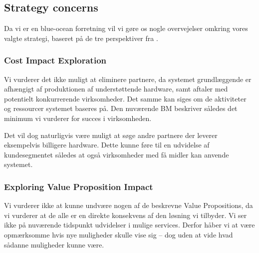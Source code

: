 \subsection{Strategy concerns}

Da vi er en blue-ocean forretning vil vi gøre os nogle overvejelser omkring vores valgte strategi, baseret på de tre perspektiver fra \cite[p. 231]{osterwalder2009business}.

\subsubsection{Cost Impact Exploration}
Vi vurderer det ikke muligt at eliminere partnere, da systemet grundlæggende er afhængigt af produktionen af understøttende hardware, samt aftaler med potentielt konkurrerende virksomheder.
Det samme kan siges om de aktiviteter og ressourcer systemet baseres på.
Den nuværende BM beskriver således det minimum vi vurderer for succes i virksomheden.

Det vil dog naturligvis være muligt at søge andre partnere der leverer eksempelvis billigere hardware.
Dette kunne føre til en udvidelse af kundesegmentet således at også virksomheder med få midler kan anvende systemet.


\subsubsection{Exploring Value Proposition Impact}
Vi vurderer ikke at kunne undvære nogen af de beskrevne Value Propositions, da vi vurderer at de alle er en direkte konsekvens af den løsning vi tilbyder.
Vi ser ikke på nuværende tidspunkt udvidelser i mulige services.
Derfor håber vi at være opmærksomme hvis nye muligheder skulle vise sig -- dog uden at vide hvad sådanne muligheder kunne være.


